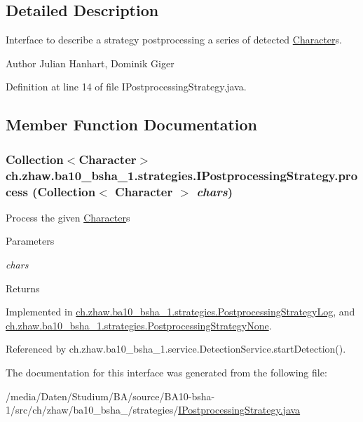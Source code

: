 \subsection{Detailed Description}
Interface to describe a strategy postprocessing a series of detected \hyperlink{classch_1_1zhaw_1_1ba10__bsha__1_1_1Character}{Character}s.

\begin{DoxyAuthor}{Author}
Julian Hanhart, Dominik Giger 
\end{DoxyAuthor}


Definition at line 14 of file IPostprocessingStrategy.java.

\subsection{Member Function Documentation}
\hypertarget{interfacech_1_1zhaw_1_1ba10__bsha__1_1_1strategies_1_1IPostprocessingStrategy_a0bb435d4c5cb8ce3b3909ad81961d912}{
\subsubsection[{process}]{\setlength{\rightskip}{0pt plus 5cm}Collection$<${\bf Character}$>$ ch.zhaw.ba10\_\-bsha\_\-1.strategies.IPostprocessingStrategy.process (Collection$<$ {\bf Character} $>$ {\em chars})}}
\label{interfacech_1_1zhaw_1_1ba10__bsha__1_1_1strategies_1_1IPostprocessingStrategy_a0bb435d4c5cb8ce3b3909ad81961d912}
Process the given \hyperlink{classch_1_1zhaw_1_1ba10__bsha__1_1_1Character}{Character}s


\begin{DoxyParams}{Parameters}
\item[{\em chars}]\end{DoxyParams}
\begin{DoxyReturn}{Returns}

\end{DoxyReturn}


Implemented in \hyperlink{classch_1_1zhaw_1_1ba10__bsha__1_1_1strategies_1_1PostprocessingStrategyLog_a284bd1d88fb08a15ec240911d11d23c9}{ch.zhaw.ba10\_\-bsha\_\-1.strategies.PostprocessingStrategyLog}, and \hyperlink{classch_1_1zhaw_1_1ba10__bsha__1_1_1strategies_1_1PostprocessingStrategyNone_af9183ec4f0802402cde7f97f746c7874}{ch.zhaw.ba10\_\-bsha\_\-1.strategies.PostprocessingStrategyNone}.

Referenced by ch.zhaw.ba10\_\-bsha\_\-1.service.DetectionService.startDetection().

The documentation for this interface was generated from the following file:\begin{DoxyCompactItemize}
\item 
/media/Daten/Studium/BA/source/BA10-\/bsha-\/1/src/ch/zhaw/ba10\_\-bsha\_/strategies/\hyperlink{IPostprocessingStrategy_8java}{IPostprocessingStrategy.java}\end{DoxyCompactItemize}
